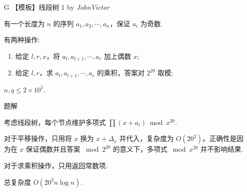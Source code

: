 \begin{frame}{G 【模板】线段树 1 {by \itshape JohnVictor}}

	有一个长度为 $n$ 的序列 $a_1,a_2,\cdots,a_n$，保证 $a_i$ 为奇数.

	有两种操作:
	\begin{enumerate}
	\item 给定 $l,r,x$，将 $a_l,a_{l+1},\cdots,a_r$ 加上偶数 $x$;
	\item 给定 $l,r$，求 $a_l,a_{l+1},\cdots,a_r$ 的乘积，答案对 $2^{20}$ 取模;
	\end{enumerate}

	$n,q\le 2\times 10^5$.

\end{frame}

\begin{frame}{题解}

	考虑线段树，每个节点维护多项式 $\prod(x+a_i)\bmod x^{20}$. 

	对于平移操作，只用将 $x$ 换为 $x+\Delta_x$ 并代入，复杂度为 $O(20^2)$。正确性是因为在 $x$ 保证偶数并且答案 $\bmod 2^{20}$ 的意义下，多项式 $\bmod x^{20}$ 并不影响结果.

	对于求乘积操作，只用返回常数项.

	总复杂度 $O(20^2 n\log n)$.

\end{frame}
